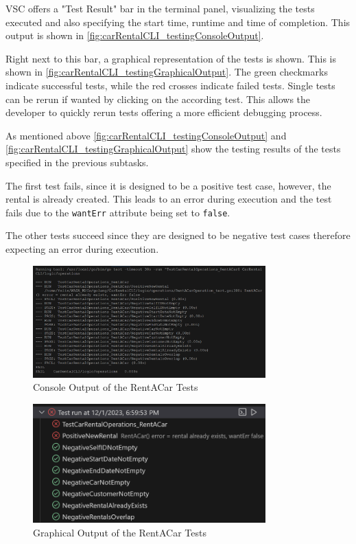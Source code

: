 VSC offers a "Test Result" bar in the terminal panel, visualizing the tests executed and also specifying the start time, runtime and time of completion.
This output is shown in \autoref{fig:carRentalCLI_testingConsoleOutput}.

Right next to this bar, a graphical representation of the tests is shown.
This is shown in \autoref{fig:carRentalCLI_testingGraphicalOutput}.
The green checkmarks indicate successful tests, while the red crosses indicate failed tests.
Single tests can be rerun if wanted by clicking on the according test.
This allows the developer to quickly rerun tests offering a more efficient debugging process.

As mentioned above \autoref{fig:carRentalCLI_testingConsoleOutput} and \autoref{fig:carRentalCLI_testingGraphicalOutput} show the testing results of the tests specified in the previous subtasks.

The first test fails, since it is designed to be a positive test case, however, the rental is already created.
This leads to an error during execution and the test fails due to the \texttt{wantErr} attribute being set to \texttt{false}.

The other tests succeed since they are designed to be negative test cases therefore expecting an error during execution.

\begin{figure}
      \centering
      \includegraphics[width=0.8\textwidth]{figures/goLang/carRental/carRentalCLI/carRentalCLI_testingConsoleOutput.png}
      \caption{Console Output of the RentACar Tests}
      \label{fig:carRentalCLI_testingConsoleOutput}
\end{figure}
\begin{figure}
      \centering
      \includegraphics[width=0.8\textwidth]{figures/goLang/carRental/carRentalCLI/carRentalCLI_testingGraphicalOutput.png}
      \caption{Graphical Output of the RentACar Tests}
      \label{fig:carRentalCLI_testingGraphicalOutput}
\end{figure}



